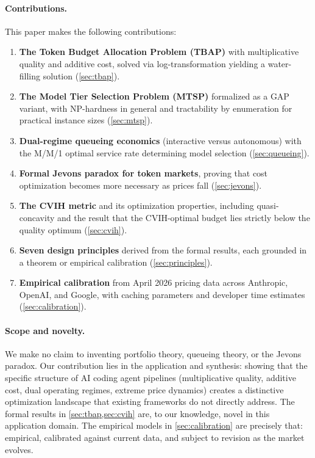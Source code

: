 \documentclass[11pt, a4paper, logo, copyright]{googledeepmind}
\begin{document}
\paragraph{Contributions.}
This paper makes the following contributions:
\begin{enumerate}[leftmargin=*, nosep]
    \item \textbf{The Token Budget Allocation Problem (TBAP)} with multiplicative quality and additive cost, solved via log-transformation yielding a water-filling solution (\cref{sec:tbap}).
    \item \textbf{The Model Tier Selection Problem (MTSP)} formalized as a GAP variant, with NP-hardness in general and tractability by enumeration for practical instance sizes (\cref{sec:mtsp}).
    \item \textbf{Dual-regime queueing economics} (interactive versus autonomous) with the M/M/1 optimal service rate determining model selection (\cref{sec:queueing}).
    \item \textbf{Formal Jevons paradox for token markets}, proving that cost optimization becomes more necessary as prices fall (\cref{sec:jevons}).
    \item \textbf{The CVIH metric} and its optimization properties, including quasi-concavity and the result that the CVIH-optimal budget lies strictly below the quality optimum (\cref{sec:cvih}).
    \item \textbf{Seven design principles} derived from the formal results, each grounded in a theorem or empirical calibration (\cref{sec:principles}).
    \item \textbf{Empirical calibration} from April 2026 pricing data across Anthropic, OpenAI, and Google, with caching parameters and developer time estimates (\cref{sec:calibration}).
\end{enumerate}

\paragraph{Scope and novelty.}
We make no claim to inventing portfolio theory, queueing theory, or the Jevons paradox. Our contribution lies in the application and synthesis: showing that the specific structure of AI coding agent pipelines (multiplicative quality, additive cost, dual operating regimes, extreme price dynamics) creates a distinctive optimization landscape that existing frameworks do not directly address. The formal results in \cref{sec:tbap,sec:cvih} are, to our knowledge, novel in this application domain. The empirical models in \cref{sec:calibration} are precisely that: empirical, calibrated against current data, and subject to revision as the market evolves.
\end{document}
